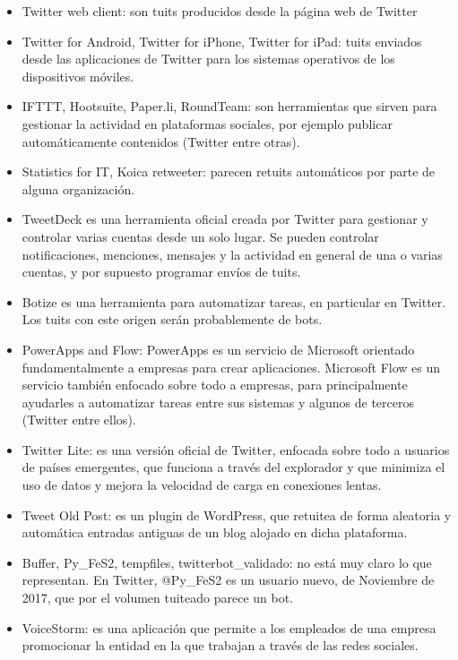 \begin{itemize}
\item Twitter web client: son tuits producidos desde la página web de Twitter
\item Twitter for Android, Twitter for iPhone, Twitter for iPad: tuits enviados desde las aplicaciones
de Twitter para los sistemas operativos de los dispositivos móviles.
\item IFTTT, Hootsuite, Paper.li, RoundTeam: son herramientas que sirven para gestionar 
la actividad en plataformas
sociales, por ejemplo publicar automáticamente contenidos (Twitter entre otras).
\item Statistics for IT, Koica retweeter: parecen retuits automáticos por parte
de alguna organización.
\item TweetDeck es una herramienta oficial creada por Twitter para gestionar y controlar 
varias cuentas desde un solo lugar. Se pueden controlar notificaciones, menciones, 
mensajes y la actividad en general de una o varias cuentas, y por supuesto programar envíos
de tuits.
\item Botize es una herramienta para automatizar tareas, en particular en Twitter. 
Los tuits con este origen serán probablemente de bots.
\item PowerApps and Flow: PowerApps es un servicio de Microsoft 
orientado fundamentalmente a empresas para crear aplicaciones. Microsoft Flow 
es un servicio también enfocado sobre todo a empresas, para principalmente ayudarles a 
automatizar tareas entre sus sistemas y algunos de terceros (Twitter entre ellos).
\item Twitter Lite: es una versión oficial de Twitter, enfocada sobre todo a usuarios 
de países emergentes, que funciona a través del explorador y que minimiza el uso de datos 
y mejora la velocidad de carga en conexiones lentas.
\item Tweet Old Post: es un plugin de WordPress, que retuitea de forma aleatoria y 
automática entradas antiguas de un blog alojado en dicha plataforma.
\item Buffer, Py\_FeS2, tempfiles, twitterbot\_validado: no está muy claro lo que representan. 
En Twitter, @Py\_FeS2 es un usuario nuevo, de Noviembre de 2017, que por el volumen 
tuiteado parece un bot.
\item VoiceStorm: es una aplicación que permite a los empleados de una empresa
promocionar la entidad en la que trabajan a través de las redes sociales.
\end{itemize}

